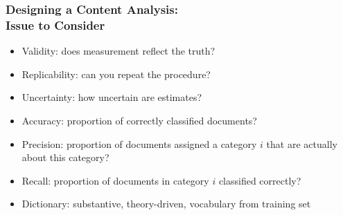 \documentclass[11pt,compress,professionalfonts]{beamer}
\newcommand{\ita}{\begin{itemize}}
\newcommand{\itm}{\item[]}
\newcommand{\itz}{\end{itemize}}
\begin{document}
\begin{frame}[t,fragile]

\end{frame}
\begin{frame}[t]\frametitle{Designing a Content Analysis:\\Issue to Consider}

\ita

\itm Validity: does measurement reflect the truth?
\itm Replicability: can you repeat the procedure?
\itm Uncertainty: how uncertain are estimates?
\itm Accuracy: proportion of correctly classified documents?
\itm Precision: proportion of documents assigned a category $i$ that are actually about this category?
\itm Recall: proportion of documents in category $i$ classified correctly?
\itm Dictionary: substantive, theory-driven, vocabulary from training set
\itz

\end{frame}
\end{document}

